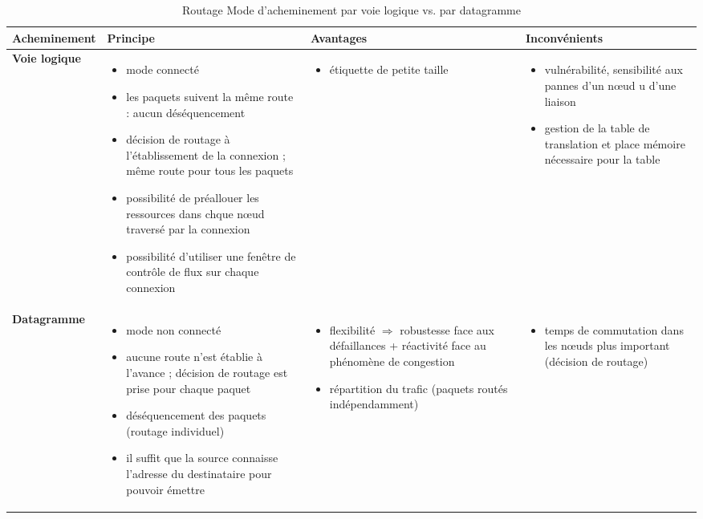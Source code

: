 \documentclass[11pt,english,french]{scrreprt}
\theoremstyle{remark}
\theoremstyle{definition}
\begin{document}
\begin{table}
\begin{tabularx}{\textwidth}{>{\bfseries}lXXX} 
	\toprule
	Acheminement		& Principe & Avantages & Inconvénients\\[0.05in]\bottomrule
	Voie logique 			& \begin{itemize}
	\item mode connecté
	\item les paquets suivent la même route : aucun déséquencement
	\item décision de routage à l'établissement de la connexion ; même route pour tous les paquets
	\item possibilité de préallouer les ressources dans chque n\oe ud traversé par la connexion
	\item possibilité d'utiliser une fenêtre de contrôle de flux sur chaque connexion
	\end{itemize} & \begin{itemize}
		\item étiquette de petite taille
	\end{itemize} & \begin{itemize}
	\item vulnérabilité, sensibilité aux pannes d'un n\oe ud u d'une liaison
	\item gestion de la table de translation et place mémoire nécessaire pour la table
	\end{itemize} \\[0.05in]
		
	Datagramme 	& \begin{itemize}
	\item mode non connecté
	\item aucune route n'est établie à l'avance ; décision de routage est prise pour chaque paquet
	\item déséquencement des paquets (routage individuel)
	\item il suffit que la source connaisse l'adresse du destinataire pour pouvoir émettre
	\end{itemize} & \begin{itemize}
		\item flexibilité $\Rightarrow$ robustesse face aux défaillances + réactivité face au phénomène de congestion
		\item répartition du trafic (paquets routés indépendamment)
	\end{itemize} & \begin{itemize}
		\item temps de commutation dans les n\oe uds plus important (décision de routage)
	\end{itemize}\\
	\bottomrule
\end{tabularx}
\caption{Routage Mode d'acheminement par voie logique vs. par datagramme}
\end{table}
\end{document}
